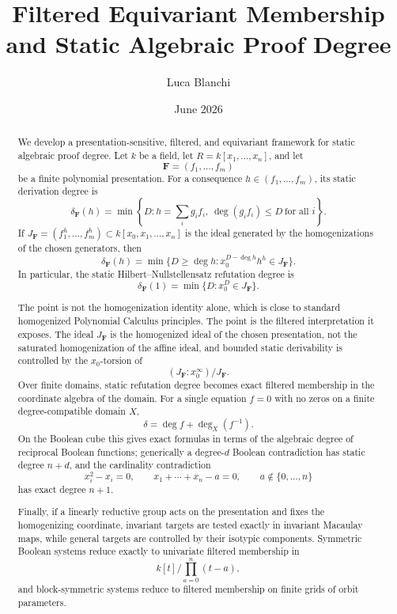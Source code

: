 \documentclass[11pt]{article}
\title{Filtered Equivariant Membership and Static Algebraic Proof Degree}
\author{Luca Blanchi}
\date{June 2026}
\begin{document}
\maketitle

\begin{abstract}
We develop a presentation-sensitive, filtered, and equivariant framework for static algebraic proof degree. Let \(k\) be a field, let \(R=k[x_1,\ldots,x_n]\), and let
\[
\mathbf F=(f_1,\ldots,f_m)
\]
be a finite polynomial presentation. For a consequence \(h\in(f_1,\ldots,f_m)\), its static derivation degree is
\[
\delta_{\mathbf F}(h)
=
\min\left\{D:
h=\sum_i g_i f_i,\ \deg(g_i f_i)\le D\ \text{for all }i
\right\}.
\]
If \(J_{\mathbf F}=(f_1^h,\ldots,f_m^h)\subset k[x_0,x_1,\ldots,x_n]\) is the ideal generated by the homogenizations of the chosen generators, then
\[
\delta_{\mathbf F}(h)
=
\min\{D\ge \deg h:x_0^{D-\deg h}h^h\in J_{\mathbf F}\}.
\]
In particular, the static Hilbert--Nullstellensatz refutation degree is
\[
\delta_{\mathbf F}(1)=\min\{D:x_0^D\in J_{\mathbf F}\}.
\]

The point is not the homogenization identity alone, which is close to standard homogenized Polynomial Calculus principles. The point is the filtered interpretation it exposes. The ideal \(J_{\mathbf F}\) is the homogenized ideal of the chosen presentation, not the saturated homogenization of the affine ideal, and bounded static derivability is controlled by the \(x_0\)-torsion of
\[
(J_{\mathbf F}:x_0^\infty)/J_{\mathbf F}.
\]
Over finite domains, static refutation degree becomes exact filtered membership in the coordinate algebra of the domain. For a single equation \(f=0\) with no zeros on a finite degree-compatible domain \(X\),
\[
\delta=\deg f+\deg_X(f^{-1}).
\]
On the Boolean cube this gives exact formulas in terms of the algebraic degree of reciprocal Boolean functions; generically a degree-\(d\) Boolean contradiction has static degree \(n+d\), and the cardinality contradiction
\[
x_i^2-x_i=0,\qquad x_1+\cdots+x_n-a=0,\qquad a\notin\{0,\ldots,n\}
\]
has exact degree \(n+1\).

Finally, if a linearly reductive group acts on the presentation and fixes the homogenizing coordinate, invariant targets are tested exactly in invariant Macaulay maps, while general targets are controlled by their isotypic components. Symmetric Boolean systems reduce exactly to univariate filtered membership in
\[
k[t]/\prod_{a=0}^n(t-a),
\]
and block-symmetric systems reduce to filtered membership on finite grids of orbit parameters.
\end{abstract}
\end{document}
